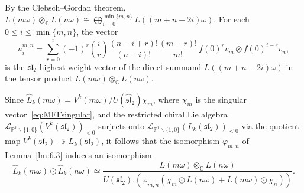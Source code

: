\documentclass[12pt,a4paper,reqno]{amsart}
\numberwithin{equation}{section}
\theoremstyle{definition}
\renewcommand{\sl}{\mathfrak{sl}}
\newcommand{\C}{\mathbb{C}}
\renewcommand{\P}{\mathbb{P}}
\def\bs{\backslash}
\def\om{\omega}
\def\o{\otimes}
\begin{document}

By the Clebsch--Gordan theorem, $L(m\om)\o_\C L(n\om)\cong \bigoplus_{i=0}^{\min\{m,n\}} L((m+n-2i)\om)$.
For each $0\leq i\leq \min\{m,n\}$, the vector
\begin{equation}\label{eq:sl2highestweight}
u_i^{m,n}=
\sum_{r=0}^{i}
(-1)^r
\binom{i}{r}
\frac{(n-i+r)!}{(n-i)!}
\frac{(m-r)!}{m!}\,
f(0)^rv_m\otimes f(0)^{i-r}v_n,
\end{equation}
 is the $\sl_2$-highest-weight vector of the direct summand $L((m+n-2i)\om)$ in the tensor product $L(m\om)\o_\C L(n\om)$.

 Since $\hat{L}_k(m\om)=V^k(m\om)/U(\hat{\sl}_2)\chi_m$, where $\chi_m$ is the singular vector~\eqref{eq:MFFsingular}, and the restricted chiral Lie algebra $\mathcal{L}_{\P^1\bs\{1,0\}}(V^k(\sl_2))_{<0}$ surjects onto $\mathcal{L}_{\P^1\bs\{1,0\}}(L_k(\sl_2))_{<0}$ via the quotient map $V^k(\sl_2)\twoheadrightarrow L_k(\sl_2)$, it follows that the isomorphism $\varphi_{m,n}$ of Lemma~\ref{lm:6.3} induces an isomorphism
\begin{equation}\label{eq:firstdescriptionofodot}
\hat{L}_k(m\om)\odot \hat{L}_k(n\om)\simeq \frac{L(m\om)\o_\C L(n\om)}{U(\sl_2).\left(\varphi_{m,n}(\chi_m\odot L(n\om)+L(m\om)\odot \chi_n )\right)}.
\end{equation}
\end{document}
